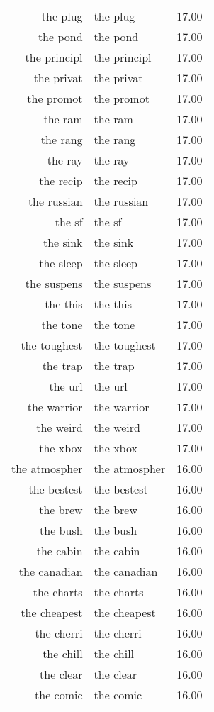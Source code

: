\begin{table}[ht]
\begin{tabular}{rlr}
  the plug & the plug & 17.00 \\ 
  the pond & the pond & 17.00 \\ 
  the principl & the principl & 17.00 \\ 
  the privat & the privat & 17.00 \\ 
  the promot & the promot & 17.00 \\ 
  the ram & the ram & 17.00 \\ 
  the rang & the rang & 17.00 \\ 
  the ray & the ray & 17.00 \\ 
  the recip & the recip & 17.00 \\ 
  the russian & the russian & 17.00 \\ 
  the sf & the sf & 17.00 \\ 
  the sink & the sink & 17.00 \\ 
  the sleep & the sleep & 17.00 \\ 
  the suspens & the suspens & 17.00 \\ 
  the this & the this & 17.00 \\ 
  the tone & the tone & 17.00 \\ 
  the toughest & the toughest & 17.00 \\ 
  the trap & the trap & 17.00 \\ 
  the url & the url & 17.00 \\ 
  the warrior & the warrior & 17.00 \\ 
  the weird & the weird & 17.00 \\ 
  the xbox & the xbox & 17.00 \\ 
  the atmospher & the atmospher & 16.00 \\ 
  the bestest & the bestest & 16.00 \\ 
  the brew & the brew & 16.00 \\ 
  the bush & the bush & 16.00 \\ 
  the cabin & the cabin & 16.00 \\ 
  the canadian & the canadian & 16.00 \\ 
  the charts & the charts & 16.00 \\ 
  the cheapest & the cheapest & 16.00 \\ 
  the cherri & the cherri & 16.00 \\ 
  the chill & the chill & 16.00 \\ 
  the clear & the clear & 16.00 \\ 
  the comic & the comic & 16.00 \\ 

\end{tabular}
\end{table}
